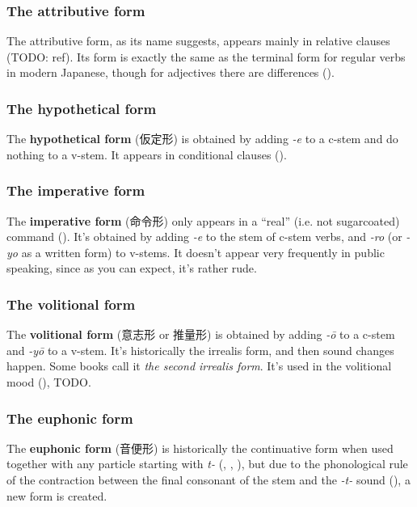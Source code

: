 \documentclass[UTF8, a4paper, oneside, scheme=plain]{ctexrep}
\newcommand*{\concept}[1]{\textbf{#1}}
\newcommand*{\term}[1]{\emph{#1}}
\newcommand{\corpus}[1]{\emph{#1}}
\begin{document}
\subsubsection{The attributive form}

The attributive form, as its name suggests, appears mainly in relative clauses (TODO: ref).
Its form is exactly the same as the terminal form for regular verbs in modern Japanese,
though for adjectives there are differences ().

\subsubsection{The hypothetical form}

The \concept{hypothetical form} (仮定形) is obtained by adding \corpus{-e} to a c-stem and do nothing to a v-stem.
It appears in conditional clauses ().

\subsubsection{The imperative form}\label{sec:imperative-form}

The \concept{imperative form} (命令形) only appears in a ``real'' (i.e. not sugarcoated) command 
().
It's obtained by adding \corpus{-e} to the stem of c-stem verbs,
and \corpus{-ro} (or \corpus{-yo} as a written form) to v-stems.
It doesn't appear very frequently in public speaking, 
since as you can expect, 
it's rather rude.

\subsubsection{The volitional form}\label{sec:volition-form}

The \concept{volitional form} (意志形 or 推量形)
is obtained by adding \corpus{-\={o}} to a c-stem and \corpus{-y\={o}} to a v-stem.
It's historically the irrealis form,
and then sound changes happen.
Some books call it \term{the second irrealis form}.
It's used in the volitional mood (), TODO.

\subsubsection{The euphonic form}\label{sec:euphonic-form}

The \concept{euphonic form} (音便形) is 
historically the continuative form when used together with any particle starting with \corpus{t-}
(, , ),
but due to the phonological rule of the contraction 
between the final consonant of the stem and the \corpus{-t-} sound (),
a new form is created. 
\end{document}
